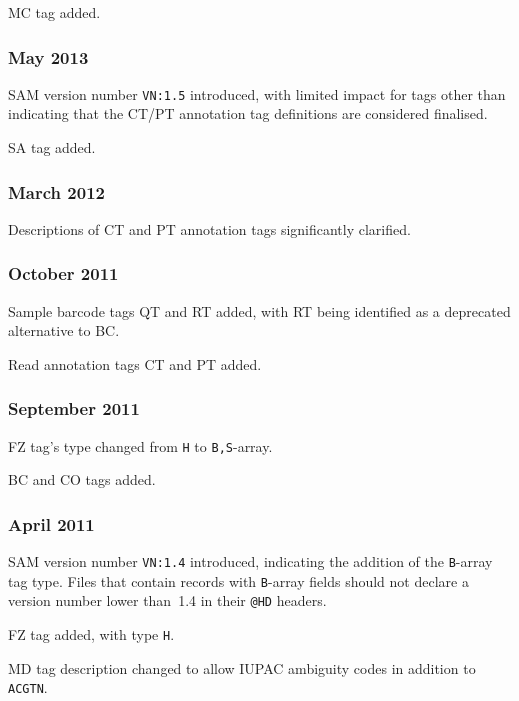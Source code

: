 \documentclass[10pt]{article}
\begin{document}
\begin{appendices}
MC tag added.

\subsubsection*{May 2013}

SAM version number {\tt VN:1.5} introduced, with limited impact for tags other than indicating that the CT/PT annotation tag definitions are considered finalised.

\gap
SA tag added.

\subsubsection*{March 2012}

Descriptions of CT and PT annotation tags significantly clarified.

\subsubsection*{October 2011}

Sample barcode tags QT and RT added, with RT being identified as a deprecated alternative to BC.

Read annotation tags CT and PT added.

\subsubsection*{September 2011}

FZ tag's type changed from {\tt H} to {\tt B,S}-array.

BC and CO tags added.

\subsubsection*{April 2011}

SAM version number {\tt VN:1.4} introduced, indicating the addition of the {\tt B}-array tag type.
Files that contain records with {\tt B}-array fields should not declare a version number lower than~1.4 in their {\tt @HD} headers.

\gap
FZ tag added, with type {\tt H}.

MD tag description changed to allow IUPAC ambiguity codes in addition to {\tt ACGTN}.


\end{appendices}
\end{document}

